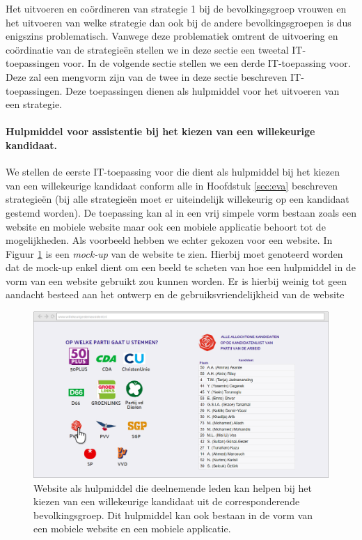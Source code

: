 Het uitvoeren en co\"{o}rdineren van strategie 1 bij de bevolkingsgroep vrouwen en het uitvoeren van welke strategie dan ook bij de andere bevolkingsgroepen is dus enigszins problematisch. Vanwege deze problematiek omtrent de uitvoering en co\"{o}rdinatie van de strategie\"{e}n stellen we in deze sectie een tweetal IT-toepassingen voor. In de volgende  sectie stellen we een derde IT-toepassing voor. Deze zal een mengvorm zijn van de twee in deze sectie beschreven IT-toepassingen. Deze toepassingen dienen als hulpmiddel voor het uitvoeren van een strategie.

\paragraph{Hulpmiddel voor assistentie bij het kiezen van een willekeurige kandidaat.}
We stellen de eerste IT-toepassing voor die dient als hulpmiddel bij het kiezen van een willekeurige kandidaat conform alle in Hoofdstuk \ref{sec:eva} beschreven strategie\"{e}n (bij alle strategie\"{e}n moet er uiteindelijk willekeurig op een kandidaat gestemd worden). De toepassing kan al in een vrij simpele vorm bestaan zoals een website en mobiele website maar ook een mobiele applicatie behoort tot de mogelijkheden. Als voorbeeld hebben we echter gekozen voor een website. In Figuur \ref{fig:verkW} is een \textit{mock-up} van de website te zien. Hierbij moet genoteerd worden dat de mock-up enkel dient om een beeld te scheten van hoe een hulpmiddel in de vorm van een website gebruikt zou kunnen worden. Er is hierbij weinig tot geen aandacht besteed aan het ontwerp en de gebruiksvriendelijkheid van de website




\begin{figure}[H]


	\includegraphics[width=\linewidth]{website_verkiezingen1.png}

			\caption{Website als hulpmiddel die deelnemende leden kan helpen bij het kiezen van een willekeurige kandidaat uit de corresponderende bevolkingsgroep. Dit hulpmiddel kan ook bestaan in de vorm van een mobiele website en een mobiele applicatie.}

\label{fig:verkW}
\end{figure}

